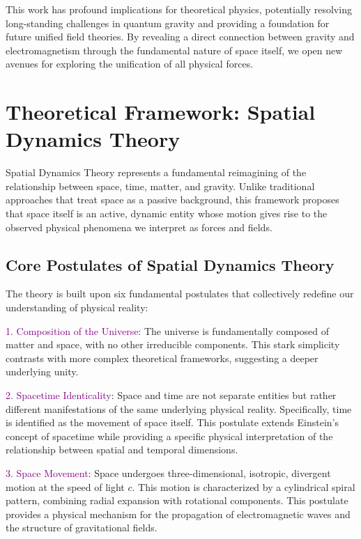 \documentclass[nature,numbers]{article}
\newcommand{\postulate}[1]{\textcolor{purple}{#1}} %
\begin{document}
This work has profound implications for theoretical physics, potentially resolving long-standing challenges in quantum gravity and providing a foundation for future unified field theories. By revealing a direct connection between gravity and electromagnetism through the fundamental nature of space itself, we open new avenues for exploring the unification of all physical forces.

\section{Theoretical Framework: Spatial Dynamics Theory}

Spatial Dynamics Theory represents a fundamental reimagining of the relationship between space, time, matter, and gravity. Unlike traditional approaches that treat space as a passive background, this framework proposes that space itself is an active, dynamic entity whose motion gives rise to the observed physical phenomena we interpret as forces and fields.

\subsection{Core Postulates of Spatial Dynamics Theory}

The theory is built upon six fundamental postulates that collectively redefine our understanding of physical reality:

\postulate{1. Composition of the Universe}: The universe is fundamentally composed of matter and space, with no other irreducible components. This stark simplicity contrasts with more complex theoretical frameworks, suggesting a deeper underlying unity.

\postulate{2. Spacetime Identicality}: Space and time are not separate entities but rather different manifestations of the same underlying physical reality. Specifically, time is identified as the movement of space itself. This postulate extends Einstein's concept of spacetime while providing a specific physical interpretation of the relationship between spatial and temporal dimensions.

\postulate{3. Space Movement}: Space undergoes three-dimensional, isotropic, divergent motion at the speed of light $c$. This motion is characterized by a cylindrical spiral pattern, combining radial expansion with rotational components. This postulate provides a physical mechanism for the propagation of electromagnetic waves and the structure of gravitational fields.
\end{document}
